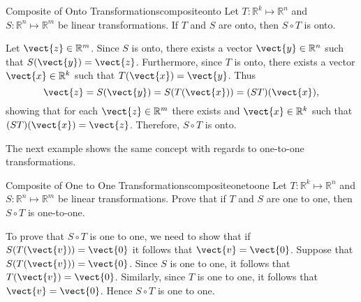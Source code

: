 \begin{example}{Composite of Onto Transformations}{compositeonto}
Let $T: \mathbb{R}^k \mapsto \mathbb{R}^n$ and $S: \mathbb{R}^n \mapsto \mathbb{R}^m$ be linear transformations. 
If $T$ and $S$ are onto, then $S \circ T$ is onto.
\end{example}

\begin{solution}
Let $\vect{z}\in \mathbb{R}^m$.  
Since $S$ is onto, there exists a vector $\vect{y}\in \mathbb{R}^n$
such that $S(\vect{y})=\vect{z}$.
Furthermore, since $T$ is onto, there exists a vector $\vect{x}\in \mathbb{R}^k$
such that $T(\vect{x})=\vect{y}$.
Thus
\[ \vect{z} = S(\vect{y}) = S(T(\vect{x})) = (ST)(\vect{x}),\]
showing that for each $\vect{z}\in \mathbb{R}^m$ there exists and $\vect{x}\in \mathbb{R}^k$
such that $(ST)(\vect{x})=\vect{z}$.
Therefore, $S \circ T$ is onto.
\end{solution}

The next example shows the same concept with regards to one-to-one transformations. 

\begin{example}{Composite of One to One Transformations}{compositeonetoone}
Let $T: \mathbb{R}^k \mapsto \mathbb{R}^n$ and $S: \mathbb{R}^n \mapsto \mathbb{R}^m$ be linear transformations. 
Prove that if $T$ and $S$ are one to one, then $S \circ T$ 
is one-to-one.
\end{example}

\begin{solution}
To prove that $S \circ T$ is one to one, we need to show that if $S(T (\vect{v})) = \vect{0}$ it follows that $\vect{v} = \vect{0}$. 
Suppose that  $S(T (\vect{v})) = \vect{0}$. Since $S$ is one to one, it follows that  $T (\vect{v}) = \vect{0}$. Similarly, since $T$ is one to one, it follows that $\vect{v} = \vect{0}$. Hence $S \circ T$ is one to one. 
\end{solution}
